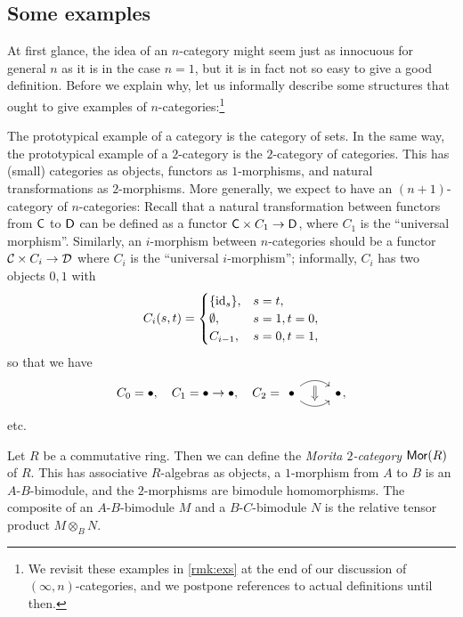 \documentclass[a4paper,11pt]{article}
\begin{document}
\subsection{Some examples}\label{subsec:exs}

At first glance, the idea of an $n$-category might seem just as
innocuous for general $n$ as it is in the case $n=1$, but it is in
fact not so easy to give a good definition. Before we explain why, let
us informally describe some structures that ought to give examples of
$n$-categories:\footnote{We revisit these examples in \cref{rmk:exs} at the end of our
  discussion of $(\infty,n)$-categories, and we postpone references to
actual definitions until then.}

\begin{ex}\label{ex:catofncat}
  The prototypical example of a category is the category of sets.  In
  the same way, the prototypical example of a $2$-category is the
  $2$-category of categories. This has (small) categories as objects,
  functors as $1$-morphisms, and natural transformations as
  $2$-morphisms. More generally, we expect to have an $(n+1)$-category
  of $n$-categories: Recall that a natural transformation between
  functors from $\textup{\textsf{C}}$ to $\textup{\textsf{D}}$ can be
  defined as a functor $\uC \times C_{1} \to \uD$, where $C_{1}$ is
  the ``universal morphism''.
  Similarly, an $i$-morphism between $n$-categories should be a
  functor $\eC \times C_{i} \to \eD$ where $C_{i}$ is the ``universal
  $i$-morphism''; informally, $C_{i}$ has two objects $0,1$ with
  \[
    C_{i}(s,t) =
    \begin{cases}
      \{\text{\textup{id}}_{s}\}, & s = t, \\
      \emptyset, & s = 1, t = 0, \\
      C_{i-1}, & s = 0, t = 1,
    \end{cases}
  \]
  so that we have
  \[ C_{0}=\bullet,\quad C_{1} = \bullet \to \bullet, \quad C_{2} =
        \begin{tikzcd}
      \bullet \ar[r, bend left=40, ""{below,name=A,inner sep=2pt}]
      \ar[r, bend right=40, ""{above,name=B,inner sep=2pt}] & \bullet
      \ar[from=A, to=B, Rightarrow]
    \end{tikzcd}\!\!,
  \]
  etc.
\end{ex}

\begin{ex}\label{ex:morita}
  Let $R$ be a commutative ring. Then we can define the \emph{Morita
    $2$-category} $\textup{\textsf{Mor}}(R)$ of $R$. This has associative $R$-algebras as objects,
  a $1$-morphism from $A$ to $B$ is an $A$-$B$-bimodule, and the
  $2$-morphisms are bimodule homomorphisms. The composite of an
  $A$-$B$-bimodule $M$ and a $B$-$C$-bimodule $N$ is the relative
  tensor product $M \otimes_{B} N$.
\end{ex}
\end{document}
